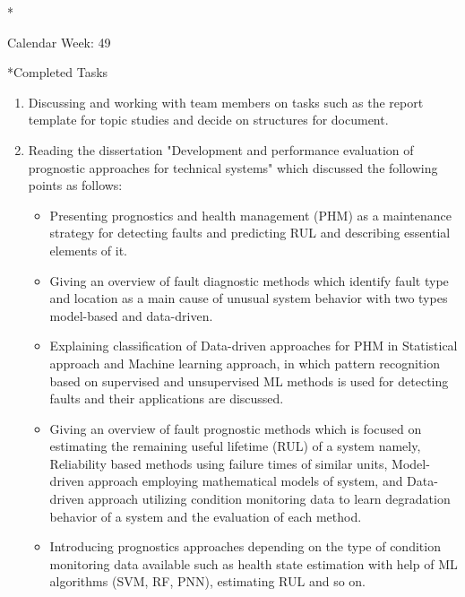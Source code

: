 \documentclass[11pt,a4paper]{article}
\begin{document}
\newpage
\begin{section}*{Calendar Week: 49 \hfill \date{04 December, 2020}}
 \begin{refsection}

       \begin{subsection}*{Completed Tasks}
             \begin{enumerate}
                   \item Discussing and working with team members on tasks such as the report template for topic studies and decide on structures for document.
                    \item Reading the dissertation "Development and performance evaluation of prognostic approaches for technical systems"\cite{DBLP:phd/dnb/Kimotho16} which discussed the following points as follows:
                         \begin{itemize}
                             \item Presenting prognostics and health management (PHM) as a maintenance strategy for detecting faults and predicting RUL and describing essential elements of it. 
                            \item Giving an overview of fault diagnostic methods which identify fault type and location as a main cause of unusual system behavior with two types model-based and data-driven.
                            \item Explaining classification of Data-driven approaches for PHM in Statistical approach and Machine learning approach, in which pattern recognition based on supervised and unsupervised ML methods is used for detecting faults and their applications are discussed.
                            \item Giving an overview of fault prognostic methods which is focused on estimating the remaining useful lifetime (RUL) of a system namely, Reliability based methods using failure times of similar units, Model-driven approach employing mathematical models of system, and Data-driven approach utilizing condition monitoring data to learn degradation behavior of a system and the evaluation of each method.
                            \item Introducing prognostics approaches depending on the type of condition monitoring data available such as health state estimation with help of ML algorithms (SVM, RF, PNN), estimating RUL and so on.
                        \end{itemize}
             \end{enumerate}
       \end{subsection}


\end{refsection}
\end{section}
\end{document}
